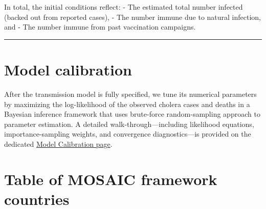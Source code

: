 \documentclass[
]{book}
\begin{document}
In total, the initial conditions reflect:
- The estimated total number infected (backed out from reported cases),
- The number immune due to natural infection, and
- The number immune from past vaccination campaigns.

\begin{center}\rule{0.5\linewidth}{0.5pt}\end{center}

\section{Model calibration}\label{model-calibration}

After the transmission model is fully specified, we tune its numerical parameters by maximizing the log-likelihood of the observed cholera cases and deaths in a Bayesian inference framework that uses brute-force random-sampling approach to parameter estimation. A detailed walk-through---including likelihood equations, importance-sampling weights, and convergence diagnostics---is provided on the dedicated \href{https://www.mosaicmod.org/model-calibration-1.html}{Model Calibration page}.

\label{mosaic-table}

\section{Table of MOSAIC framework countries}\label{table-of-mosaic-framework-countries}
\end{document}
